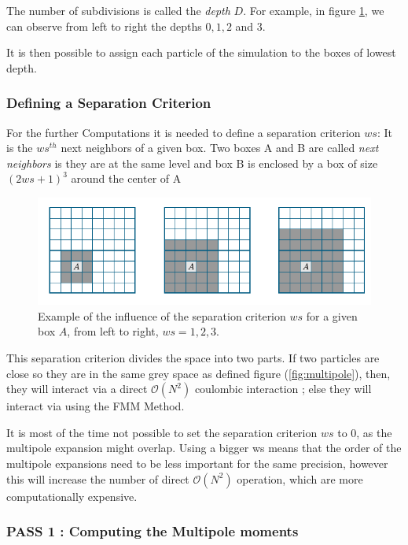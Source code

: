 \documentclass[11pt,twoside,a4paper]{report}
\begin{document}
    
    The number of subdivisions is called the \textit{depth} $D$. For example, in figure \ref{fig:depth}, we can observe from left to right the depths $0,1,2$ and $3$.
    
    It is then possible to assign each particle of the simulation to the boxes of lowest depth.
    
	\subsubsection{Defining a Separation Criterion}
	
	For the further Computations it is needed to define a separation criterion $ws$: It is the $ws^{th}$ next neighbors of a given box. Two boxes A and B are called \textit{next neighbors} is they are at the same level and box B is enclosed by a box of size $(2 ws + 1)^3$ around the center of A 
	
	
	
	
	\begin{figure}[H]
    \includegraphics[scale=0.7]{separation}    
    \centering 
    \caption{Example of the influence of the separation criterion $ws$ for a given box $A$, from left to right, $ws = 1,2,3$.}    
    \label{fig:depth}
     \end{figure}
	
		This separation criterion divides the space into two parts. If two particles are close so they are in the same grey space as defined figure (\ref{fig:multipole}), then, they will interact via a direct $\mathcal{O}(N^2)$ coulombic interaction ; else they will interact via using the FMM Method.
	
	It is most of the time not possible to set the separation criterion $ws$ to 0, as the multipole expansion might overlap. Using a bigger ws means that the order of the multipole expansions need to be less important for the same precision, however this will increase the number of direct $\mathcal{O}(N^2)$ operation, which are  more computationally expensive.       
    
    
    \subsubsection{PASS 1 : Computing the Multipole moments}
    
\end{document}
